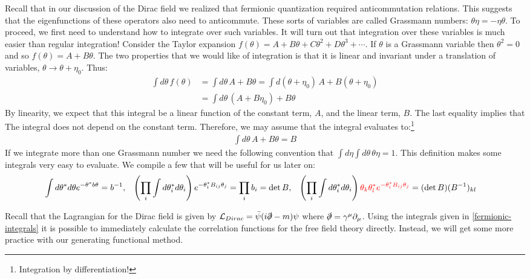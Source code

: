 \documentclass{report}
\theoremstyle{plain}
\theoremstyle{definition}
\theoremstyle{remark}
\newcommand{\mc}{\mathcal}
\newcommand{\gam}{\gamma}
\newcommand{\di}{\partial}
\begin{document}
Recall that in our discussion of the Dirac field we realized that fermionic
quantization required anticommutation relations. This suggests that the
eigenfunctions of these operators also need to anticommute. These sorts of
variables are called Grassmann numbers: $\theta\eta = -\eta\theta$. To
proceed, we first need to understand how to integrate over such variables.
It will turn out that integration over these variables is much easier than
regular integration! Consider the Taylor expansion $f(\theta) = A +
B\theta+C\theta^2+D\theta^3 + \cdots$. If $\theta$ is a Grassmann variable
then $\theta^2=0$ and so $f(\theta) = A + B\theta$. The two properties that
we would like of integration is that it is linear and invariant under a
translation of variables, $\theta\to \theta+\eta_0$. Thus:
\begin{align*}
    \int d\theta\, f(\theta) &= \int d\theta\,A+B\theta
    = \int d(\theta+\eta_0)\, A+B(\theta+\eta_0)\\
    &= \int d\theta\, (A+B\eta_0) + B\theta
\end{align*}
By linearity, we expect that this integral be a linear function of the
constant term, $A$, and the linear term, $B$. The last equality implies that 
The integral does not depend on the constant term. Therefore, we may assume
that the integral evaluates to:\footnote{Integration by differentiation!}
\begin{align*}
    \int d\theta\, A+B\theta = B
\end{align*}
If we integrate more than one Grassmann number we need the following
convention that $\int d\eta\int d\theta\,\theta\eta = 1$.
This definition makes some integrals very easy to evaluate. We compile a
few that will be useful for us later on:
\begin{align}
    \int d\theta^* d\theta e^{-\theta^* b\theta} &= b^{-1}, &
    \left(\prod_i\int d\theta_i^*d\theta_i\right)
    e^{-\theta_i^*B_{ij}\theta_j} = \prod_i b_i &= \det B, &
    \left(\prod_i\int d\theta_i^*d\theta_i\right)
{\color{red}\theta_k\theta_l^*e^{-\theta_i^*B_{ij}\theta_j}} &= (\det
B)(B^{-1})_{kl}
    \label{fermionic-integrals}
\end{align}

Recall that the Lagrangian for the Dirac field is given by $\mc L_{Dirac} =
\bar\psi (i\slashed\di - m) \psi$ where $\slashed\di = \gam^\mu\di_\mu$.
Using the integrals given in \eqref{fermionic-integrals} it is possible to
immediately calculate the correlation functions for the free field theory
directly. Instead, we will get some more practice with our generating
functional method.
\end{document}
